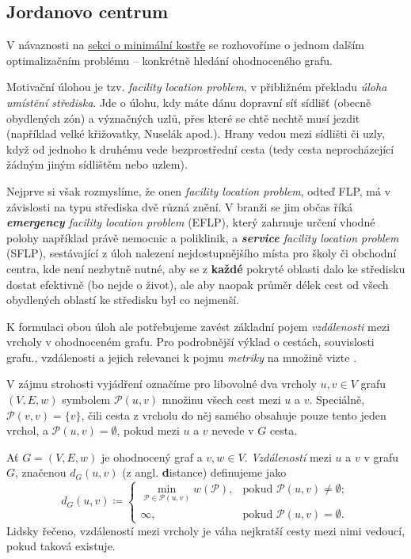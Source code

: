 \subsection{Jordanovo centrum}
\label{ssec:jordanovo-centrum}

V návaznosti na \hyperref[sssec:minimalni-kostra]{sekci o minimální kostře} se
rozhovoříme o jednom dalším optimalizačním problému -- konkrétně hledání
 ohodnoceného grafu.

Motivační úlohou je tzv. \emph{facility location problem}, v přibližném překladu
\emph{úloha umístění střediska}. Jde o úlohu, kdy máte dánu dopravní síť sídlišť
(obecně obydlených zón) a význačných uzlů, přes které se chtě nechtě musí jezdit
(například velké křižovatky, Nuselák apod.). Hrany vedou mezi sídlišti či uzly,
když od jednoho k druhému vede bezprostřední cesta (tedy cesta neprocházející
žádným jiným sídlištěm nebo uzlem).

Nejprve si však rozmyslíme, že onen \emph{facility location problem}, odteď
FLP, má v závislosti na typu střediska dvě různá znění. V branži se jim občas
říká \emph{\textbf{emergency} facility location problem} (EFLP), který zahrnuje
určení vhodné polohy například právě nemocnic a poliklinik, a
\emph{\textbf{service} facility location problem} (SFLP), sestávající z úloh
nalezení nejdostupnějšího místa pro školy či obchodní centra, kde není nezbytně
nutné, aby se z \textbf{každé} pokryté oblasti dalo ke středisku dostat
efektivně (bo nejde o život), ale aby naopak průměr délek cest od všech
obydlených oblastí ke středisku byl co nejmenší.

K formulaci obou úloh ale potřebujeme zavést základní pojem \emph{vzdálenosti}
mezi vrcholy v ohodnoceném grafu. Pro podrobnější výklad o cestách, souvislosti
grafu., vzdálenosti a jejich relevanci k pojmu \emph{metriky} na množině vizte
.

V zájmu strohosti vyjádření označíme pro libovolné dva vrcholy $u,v \in V$
grafu $(V,E,w)$ symbolem $\mathcal{P}(u,v)$ množinu všech cest mezi $u$ a $v$.
Speciálně, $\mathcal{P}(v,v) = \{v\}$, čili cesta z vrcholu do něj samého
obsahuje pouze tento jeden vrchol, a $\mathcal{P}(u,v) = \emptyset$, pokud mezi
$u$ a $v$ nevede v $G$ cesta.

\begin{definition}
\label{def:vzdalenost-v-grafu}
 Ať $G = (V,E,w)$ je ohodnocený graf a $v,w \in V$. \emph{Vzdáleností} mezi $u$
 a $v$ v grafu $G$, značenou $d_G(u,v)$ (z angl. \textbf{d}istance) definujeme
 jako
 \[
  d_G(u,v) \coloneqq 
  \begin{cases}
   \min_{\mathcal{P} \in \mathcal{P}(u,v)} w(\mathcal{P}),& \text{pokud }
   \mathcal{P}(u,v) \neq \emptyset;\\
   \infty, &\text{pokud } \mathcal{P}(u,v) = \emptyset.
  \end{cases}
 \]
 Lidsky řečeno, vzdáleností mezi vrcholy je váha nejkratší cesty mezi nimi
 vedoucí, pokud taková existuje.
\end{definition}

